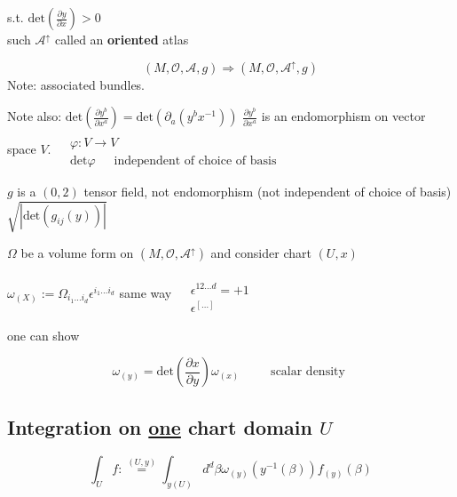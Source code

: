 	s.t. $\text{det}\left( \frac{ \partial y}{ \partial x} \right) >0$  \\
	\phantom{ \quad \, } such $\mathcal{A}^{\uparrow} $ called an \textbf{oriented} atlas 
	
	\[
	(M, \mathcal{O}, \mathcal{A},g) \Longrightarrow (M,\mathcal{O},\mathcal{A}^{\uparrow} ,g)
	\]
	Note: associated bundles.
	
	Note also:
	$ \text{det}\left( \frac{ \partial y^b}{ \partial x^a} \right) = \text{det}(\partial_a(y^bx^{-1}))$ \phantom{ \quad \quad \, } $\frac{ \partial y^b}{ \partial x^a}$ is an endomorphism on vector space $V$.  $\begin{aligned} & \quad \\ 
	& \varphi : V \to V \\
	& \text{det}\varphi \quad \, \text{ independent of choice of basis } \end{aligned}$
	
	\phantom{\quad \quad \, } $g$ is a $(0,2)$ tensor field, not endomorphism (not independent of choice of basis) $\sqrt{ |\text{det}(g_{ij}(y)) | }$
	
	\begin{definition} $\Omega$ be a volume form on $(M,\mathcal{O}, \mathcal{A}^{\uparrow} )$ and consider chart $(U,x)$ 
		\begin{definition} $\omega_{(X)} := \Omega_{i_1\dots i_d} \epsilon^{i_1\dots i_d}$
			same way $\begin{aligned} & \quad \\ 
			& \epsilon^{12 \dots d} = +1 \\ 
			& \epsilon^{[\dots ]} \end{aligned}$
			
			one can show
			
			\[
			\boxed{ \omega_{(y)} = \text{det}\left( \frac{ \partial x}{ \partial y} \right) \omega_{(x)} } \quad \quad \, \text{ scalar density }
			\]
		\end{definition}
	\end{definition}
	
	\subsection{Integration on \underline{one} chart domain $U$}
	
	\begin{definition}
		\begin{equation}
		\boxed{ \int_U f :\overset{ (U,y) }{=} \int_{y(U)} d^d\beta \omega_{(y)}(y^{-1}(\beta)) f_{(y)}(\beta) }
		\end{equation}
	\end{definition}
	
